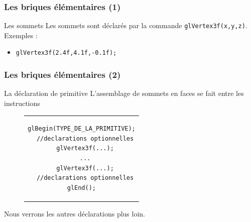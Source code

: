 \documentclass{beamer}
\begin{document}
\begin{frame}
\frametitle{Les briques élémentaires (1)}
	\begin{block}{Les sommets}
		Les sommets sont déclarés par la commande \verb!glVertex3f(x,y,z)!.\\
		Exemples :
		\begin{itemize}
			\item \alert{\verb!glVertex3f(2.4f,4.1f,-0.1f);!}
		\end{itemize}
	\end{block}
\end{frame}

\begin{frame}[fragile]
\frametitle{Les briques élémentaires (2)}
	\begin{block}{La déclaration de primitive}
		L'assemblage de sommets en faces se fait entre les instructions\\
		\begin{figure}[h]
			\centering
			\begin{tabular}{c}
				\begin{lstlisting}
glBegin(TYPE_DE_LA_PRIMITIVE);
  //declarations optionnelles
  glVertex3f(...);
  ...
  glVertex3f(...);
  //declarations optionnelles
glEnd();
				\end{lstlisting}
			\end{tabular}
		\end{figure}
		Nous verrons les autres déclarations plus loin.
	\end{block}
\end{frame}
\end{document}
